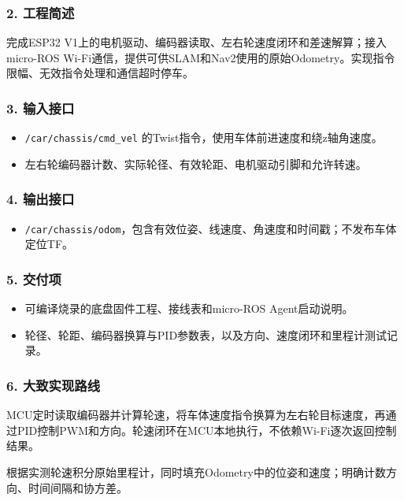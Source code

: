 \documentclass[UTF8,fontset=fandol,11pt,a4paper]{ctexart}
\begin{document}
\subsubsection*{2. 工程简述}
完成ESP32 V1上的电机驱动、编码器读取、左右轮速度闭环和差速解算；接入micro-ROS Wi-Fi通信，提供可供SLAM和Nav2使用的原始Odometry。实现指令限幅、无效指令处理和通信超时停车。

\subsubsection*{3. 输入接口}
\begin{itemize}
\item \nolinkurl{/car/chassis/cmd_vel} 的Twist指令，使用车体前进速度和绕z轴角速度。
\item 左右轮编码器计数、实际轮径、有效轮距、电机驱动引脚和允许转速。
\end{itemize}

\subsubsection*{4. 输出接口}
\begin{itemize}
\item \nolinkurl{/car/chassis/odom}，包含有效位姿、线速度、角速度和时间戳；不发布车体定位TF。
\end{itemize}

\subsubsection*{5. 交付项}
\begin{itemize}
\item 可编译烧录的底盘固件工程、接线表和micro-ROS Agent启动说明。
\item 轮径、轮距、编码器换算与PID参数表，以及方向、速度闭环和里程计测试记录。
\end{itemize}

\subsubsection*{6. 大致实现路线}
MCU定时读取编码器并计算轮速，将车体速度指令换算为左右轮目标速度，再通过PID控制PWM和方向。轮速闭环在MCU本地执行，不依赖Wi-Fi逐次返回控制结果。

根据实测轮速积分原始里程计，同时填充Odometry中的位姿和速度；明确计数方向、时间间隔和协方差。

\end{document}
